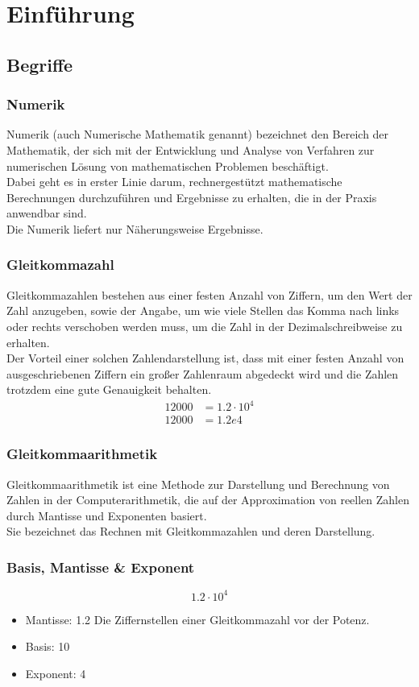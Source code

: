 \section {Einführung}
\subsection{Begriffe}

\subsubsection{Numerik}
Numerik (auch Numerische Mathematik genannt) bezeichnet den Bereich der Mathematik, der sich mit der Entwicklung und Analyse von Verfahren zur numerischen Lösung von mathematischen Problemen beschäftigt. \\
Dabei geht es in erster Linie darum, rechnergestützt mathematische Berechnungen durchzuführen und Ergebnisse zu erhalten, die in der Praxis anwendbar sind. \\
Die Numerik liefert nur Näherungsweise Ergebnisse.

\subsubsection{Gleitkommazahl}
Gleitkommazahlen bestehen aus einer festen Anzahl von Ziffern, um den Wert der Zahl anzugeben, sowie der Angabe, um wie viele Stellen das Komma nach links oder rechts verschoben werden muss, um die Zahl in der Dezimalschreibweise zu erhalten. \\
Der Vorteil einer solchen Zahlendarstellung ist, dass mit einer festen Anzahl von ausgeschriebenen Ziffern ein großer Zahlenraum abgedeckt wird und die Zahlen trotzdem eine gute Genauigkeit behalten.
\begin{align*}
	12000  &=  1.2\cdot10^4 \\
	12000 &=  1.2e4
\end{align*}

\subsubsection{Gleitkommaarithmetik} 
Gleitkommaarithmetik ist eine Methode zur Darstellung und Berechnung von Zahlen in der Computerarithmetik, die auf der Approximation von reellen Zahlen durch Mantisse und Exponenten basiert. \\
Sie bezeichnet das Rechnen mit Gleitkommazahlen und deren Darstellung.
\subsubsection{Basis, Mantisse \& Exponent}
\begin{displaymath}
	1.2 \cdot 10^4
\end{displaymath}
\begin{itemize}
	\item Mantisse: 1.2 \newline
	Die Ziffernstellen einer Gleitkommazahl vor der Potenz.
	\item Basis: 10
	\item Exponent: 4
\end{itemize}

